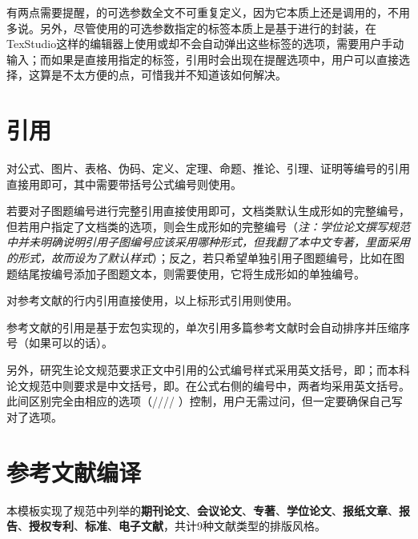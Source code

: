 \documentclass[print, promaster, vlined]{DissertUESTC}
\begin{document}
	
	有两点需要提醒，的可选参数全文不可重复定义，因为它本质上还是调用的，不用多说。另外，尽管使用的可选参数指定的标签本质上是基于进行的封装，在TexStudio这样的编辑器上使用或却不会自动弹出这些标签的选项，需要用户手动输入；而如果是直接用指定的标签，引用时会出现在提醒选项中，用户可以直接选择，这算是不太方便的点，可惜我并不知道该如何解决。
	
	
	
	\section{引用}
	
	对公式、图片、表格、伪码、定义、定理、命题、推论、引理、证明等编号的引用直接用即可，其中需要带括号公式编号则使用。
	
	若要对子图题编号进行完整引用直接使用即可，文档类默认生成形如的完整编号，但若用户指定了文档类的选项，则会生成形如的完整编号（\textit{注：学位论文撰写规范中并未明确说明引用子图编号应该采用哪种形式，但我翻了本中文专著，里面采用的形式，故而设为了默认样式}）；反之，若只希望单独引用子图题编号，比如在图题结尾按编号添加子图题文本，则需要使用，它将生成形如的单独编号。
	
	对参考文献的行内引用直接使用，以上标形式引用则使用。
	
	参考文献的引用是基于宏包实现的，单次引用多篇参考文献时会自动排序并压缩序号（如果可以的话）。

	另外，研究生论文规范要求正文中引用的公式编号样式采用英文括号，即；而本科论文规范中则要求是中文括号，即。在公式右侧的编号中，两者均采用英文括号。此间区别完全由相应的选项（//// ）控制，用户无需过问，但一定要确保自己写对了选项。
	
	
	\section{参考文献编译}
	
	本模板实现了规范中列举的\textbf{期刊论文}、\textbf{会议论文}、\textbf{专著}、\textbf{学位论文}、\textbf{报纸文章}、\textbf{报告}、\textbf{授权专利}、\textbf{标准}、\textbf{电子文献}，共计9种文献类型的排版风格。
	
\end{document}

